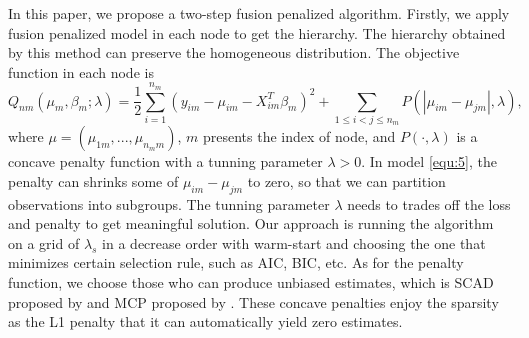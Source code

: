 \documentclass[review]{elsarticle}
\begin{document}
In this paper, we propose a two-step fusion penalized algorithm. Firstly, we apply fusion penalized model in each node to get the hierarchy. The hierarchy obtained by this method can preserve the homogeneous distribution. The objective function in each node is
\begin{equation}
\label{equ:5}
Q_{nm}(\mu_m, \beta_m;\lambda) = \frac{1}{2}\sum_{i=1}^{n_m}(y_{im}-\mu_{im}-X_{im}^T\beta_m)^2+\sum_{1\leq i<j\leq n_m}P(|\mu_{im}-\mu_{jm}|,\lambda),
\end{equation}
where $\mu=(\mu_{1m},...,\mu_{n_mm})$, $m$ presents the index of node, and $P(\cdot,\lambda)$ is a concave penalty function with a tunning parameter $\lambda>0$. In model \ref{equ:5}, the penalty can shrinks some of $\mu_{im}-\mu_{jm}$ to zero, so that we can partition observations into subgroups. The tunning parameter $\lambda$ needs to trades off the loss and penalty to get meaningful solution. Our approach is running the algorithm on a grid of $\lambda_s$ in a decrease order with warm-start and choosing the one that minimizes certain selection rule, such as AIC, BIC, etc. As for the penalty function, we choose those who can produce unbiased estimates, which is SCAD proposed by \cite{fan2001variable} and MCP proposed by \cite{zhang2010nearly}. These concave penalties
enjoy the sparsity as the L1 penalty that it can automatically yield zero estimates.
\end{document}
